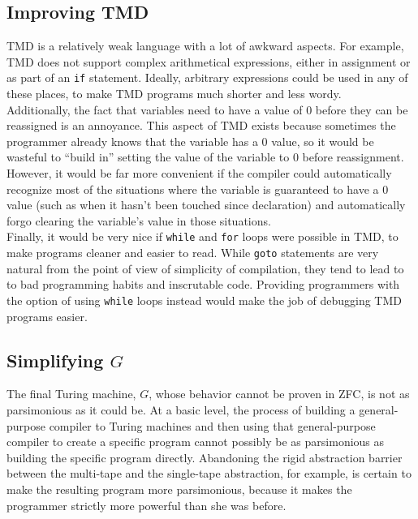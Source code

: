 \documentclass{report}
\begin{document}
\subsection{Improving TMD}

TMD is a relatively weak language with a lot of awkward aspects. For example, TMD does not support complex arithmetical expressions, either in assignment or as part of an \texttt{if} statement. Ideally, arbitrary expressions could be used in any of these places, to make TMD programs much shorter and less wordy. \\

Additionally, the fact that variables need to have a value of 0 before they can be reassigned is an annoyance. This aspect of TMD exists because sometimes the programmer already knows that the variable has a 0 value, so it would be wasteful to ``build in'' setting the value of the variable to 0 before reassignment. However, it would be far more convenient if the compiler could automatically recognize most of the situations where the variable is guaranteed to have a 0 value (such as when it hasn't been touched since declaration) and automatically forgo clearing the variable's value in those situations. \\

Finally, it would be very nice if \texttt{while} and \texttt{for} loops were possible in TMD, to make programs cleaner and easier to read. While \texttt{goto} statements are very natural from the point of view of simplicity of compilation, they tend to lead to to bad programming habits and inscrutable code. Providing programmers with the option of using \texttt{while} loops instead would make the job of debugging TMD programs easier. 

\subsection{Simplifying $G$}

The final Turing machine, $G$, whose behavior cannot be proven in ZFC, is not as parsimonious as it could be. At a basic level, the process of building a general-purpose compiler to Turing machines and then using that general-purpose compiler to create a specific program cannot possibly be as parsimonious as building the specific program directly. Abandoning the rigid abstraction barrier between the multi-tape and the single-tape abstraction, for example, is certain to make the resulting program more parsimonious, because it makes the programmer strictly more powerful than she was before. \\
\end{document}
